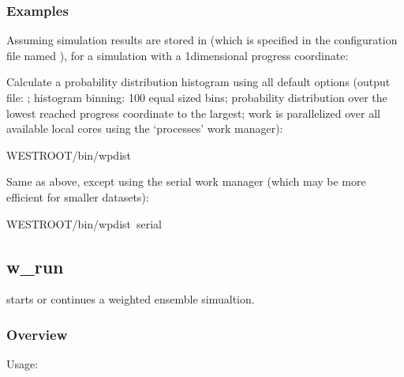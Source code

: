 \documentclass[letterpaper,10pt,english]{sphinxmanual}
\begin{document}
\subsubsection{Examples}
\label{\detokenize{users_guide/command_line_tools/w_pdist:examples}}
Assuming simulation results are stored in  (which is specified in the
configuration file named ), for a simulation with a 1\sphinxhyphen{}dimensional
progress coordinate:

Calculate a probability distribution histogram using all default options
(output file: ; histogram binning: 100 equal sized bins; probability
distribution over the lowest reached progress coordinate to the largest; work
is parallelized over all available local cores using the ‘processes’ work
manager):

\begin{sphinxVerbatim}[commandchars=\\\{\}]
\PYGZdl{}WEST\PYGZus{}ROOT/bin/w\PYGZus{}pdist
\end{sphinxVerbatim}

Same as above, except using the serial work manager (which may be more
efficient for smaller datasets):

\begin{sphinxVerbatim}[commandchars=\\\{\}]
\PYGZdl{}WEST\PYGZus{}ROOT/bin/w\PYGZus{}pdist \PYGZhy{}\PYGZhy{}serial
\end{sphinxVerbatim}


\subsection{w\_run}
\label{\detokenize{users_guide/command_line_tools/w_run:w-run}}\label{\detokenize{users_guide/command_line_tools/w_run:id1}}\label{\detokenize{users_guide/command_line_tools/w_run::doc}}
 starts or continues a weighted ensemble simualtion.


\subsubsection{Overview}
\label{\detokenize{users_guide/command_line_tools/w_run:overview}}
Usage:
\end{document}
